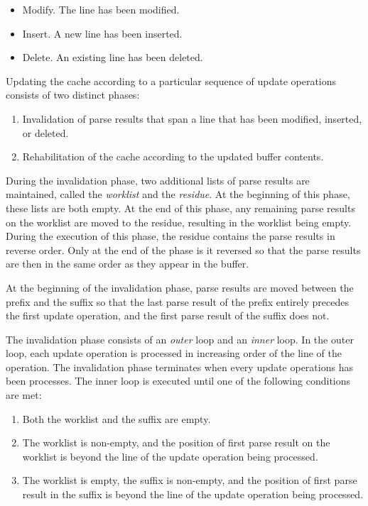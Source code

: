 \begin{itemize}
\item Modify.  The line has been modified.
\item Insert.  A new line has been inserted.
\item Delete.  An existing line has been deleted.
\end{itemize}

Updating the cache according to a particular sequence of update
operations consists of two distinct phases:

\begin{enumerate}
\item Invalidation of parse results that span a line that has been
  modified, inserted, or deleted.
\item Rehabilitation of the cache according to the updated buffer
  contents.
\end{enumerate}

During the invalidation phase, two additional lists of parse results
are maintained, called the \emph{worklist} and the \emph{residue}.  At
the beginning of this phase, these lists are both empty.  At the end
of this phase, any remaining parse results on the worklist are moved
to the residue, resulting in the worklist being empty.  During the
execution of this phase, the residue contains the parse results in
reverse order.  Only at the end of the phase is it reversed so that
the parse results are then in the same order as they appear in the
buffer.

At the beginning of the invalidation phase, parse results are moved
between the prefix and the suffix so that the last parse result of the
prefix entirely precedes the first update operation, and the first
parse result of the suffix does not.

The invalidation phase consists of an \emph{outer} loop and an
\emph{inner} loop.  In the outer loop, each update operation is
processed in increasing order of the line of the operation.  The
invalidation phase terminates when every update operations has been
processes.  The inner loop is executed until one of the following
conditions are met:

\begin{enumerate}
\item Both the worklist and the suffix are empty.
\item The worklist is non-empty, and the position of first parse
  result on the worklist is beyond the line of the update operation
  being processed.
\item The worklist is empty, the suffix is non-empty, and the position
  of first parse result in the suffix is beyond the line of the update
  operation being processed.
\end{enumerate}

